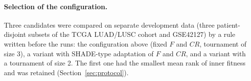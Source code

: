 \paragraph{Selection of the configuration.} Three candidates were compared on separate development data (three
patient-disjoint subsets of the TCGA LUAD/LUSC cohort and GSE42127) by a rule written before the runs: the configuration
above (fixed $F$ and $CR$, tournament of size 3), a variant with SHADE-type adaptation of $F$ and $CR$, and a variant with a
tournament of size 2. The first one had the smallest mean rank of inner fitness and was retained
(Section~\ref{sec:protocol}).

